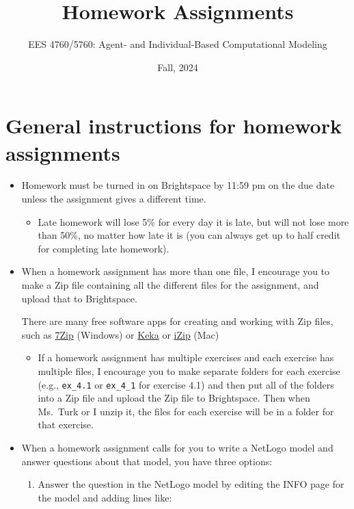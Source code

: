 \documentclass[
]{article}
\title{Homework Assignments}
\author{EES 4760/5760: Agent- and Individual-Based Computational
Modeling}
\date{Fall, 2024}
\providecommand{\tightlist}{%
  \setlength{\itemsep}{0pt}\setlength{\parskip}{0pt}}
\begin{document}
\maketitle

\section{General instructions for homework
assignments}\label{general-instructions-for-homework-assignments}

\begin{itemize}
\item
  Homework must be turned in on Brightspace by 11:59 pm on the due date
  unless the assignment gives a different time.

  \begin{itemize}
  \tightlist
  \item
    Late homework will lose 5\% for every day it is late, but will not
    lose more than 50\%, no matter how late it is (you can always get up
    to half credit for completing late homework).
  \end{itemize}
\item
  When a homework assignment has more than one file, I encourage you to
  make a Zip file containing all the different files for the assignment,
  and upload that to Brightspace.

  There are many free software apps for creating and working with Zip
  files, such as \href{https://www.7-zip.org/}{7Zip} (Windows) or
  \href{https://www.keka.io/en/}{Keka} or
  \href{https://www.izip.com/}{iZip} (Mac)

  \begin{itemize}
  \tightlist
  \item
    If a homework assignment has multiple exercises and each exercise
    has multiple files, I encourage you to make separate folders for
    each exercise (e.g., \texttt{ex\_4.1} or \texttt{ex\_4\_1} for
    exercise 4.1) and then put all of the folders into a Zip file and
    upload the Zip file to Brightspace. Then when Ms.~Turk or I unzip
    it, the files for each exercise will be in a folder for that
    exercise.
  \end{itemize}
\item
  When a homework assignment calls for you to write a NetLogo model and
  answer questions about that model, you have three options:

  \begin{enumerate}
  \def\labelenumi{\arabic{enumi}.}
  \item
    Answer the question in the NetLogo model by editing the INFO page
    for the model and adding lines like:


\end{enumerate}
\end{itemize}
\end{document}
